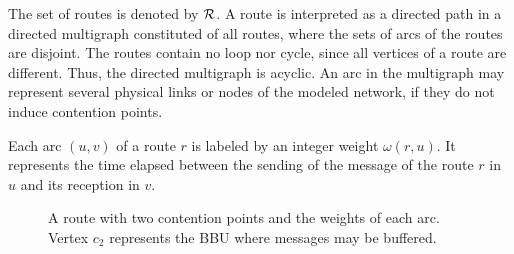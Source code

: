 \documentclass[a4paper,10pt]{journal}
\begin{document}
  	The set of routes is denoted by ${\cal R}$. A route is interpreted as a directed path in a directed multigraph constituted of all routes, where the sets of arcs of the routes are disjoint. The routes contain no loop nor cycle, since all vertices of a route are different. Thus, the directed multigraph is acyclic. An arc in the multigraph may represent several physical links or nodes of the modeled network, if they do not induce contention points. 


  	Each arc $(u,v)$ of a route $r$ is labeled by an integer weight $\omega(r,u)$. It represents the time elapsed between the sending of the message of the route $r$ in $u$ and its reception in $v$.



\begin{figure}
\centering


\caption{A route with two contention points and the weights of each arc. Vertex $c_2$ represents the BBU where messages may be buffered.}
\label{fig:routeexample}
\end{figure} 
 
\end{document}
